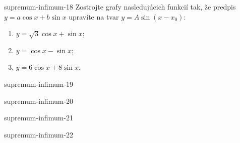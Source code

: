 \begin{defproblem}{supremum-infimum-18}
Zostrojte grafy nasledujúcich funkcií tak, že predpis $y=a\cos x +b\sin x$ upravíte na tvar $y=A\sin (x-x_0)$:
\begin{enumerate}
\item $y=\sqrt{3}\cos x +\sin x$;
\item $y=\cos x -\sin x$;
\item $y=6\cos x +8\sin x$.
\end{enumerate}
\end{defproblem}

\begin{defproblem}{supremum-infimum-19}

\end{defproblem}

\begin{defproblem}{supremum-infimum-20}

\end{defproblem}

\begin{defproblem}{supremum-infimum-21}

\end{defproblem}

\begin{defproblem}{supremum-infimum-22}

\end{defproblem}